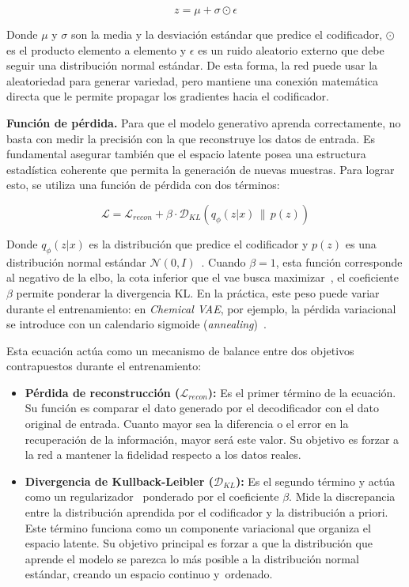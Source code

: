 \begin{equation}
z = \mu + \sigma \odot \epsilon
\end{equation}

Donde $\mu$ y $\sigma$ son la media y la desviación estándar que predice el codificador, $\odot$ es el producto elemento a elemento y $\epsilon$ es un ruido aleatorio externo que debe seguir una distribución normal estándar. De esta forma, la red puede usar la aleatoriedad para generar variedad, pero mantiene una conexión matemática directa que le permite propagar los gradientes hacia el codificador.

\textbf{Función de pérdida.} Para que el modelo generativo aprenda correctamente, no basta con medir la precisión con la que reconstruye los datos de entrada. Es fundamental asegurar también que el espacio latente posea una estructura estadística coherente que permita la generación de nuevas muestras. Para lograr esto, se utiliza una función de pérdida con dos términos:

\begin{equation}
\mathcal{L} = \mathcal{L}_{recon} + \beta \cdot \mathcal{D}_{KL}\left(q_{\phi}(z|x) \,\|\, p(z)\right)
\end{equation}

Donde $q_{\phi}(z|x)$ es la distribución que predice el codificador y $p(z)$ es una distribución normal estándar $\mathcal{N}(0, I)$~\cite{kingma2013auto}. Cuando $\beta = 1$, esta función corresponde al negativo de la \gls{elbo}, la cota inferior que el \gls{vae} busca maximizar~\cite{kingma2013auto, bishop2024deep}, el coeficiente $\beta$ permite ponderar la divergencia KL. En la práctica, este peso puede variar durante el entrenamiento: en \textit{Chemical VAE}, por ejemplo, la pérdida variacional se introduce con un calendario sigmoide (\textit{annealing})~\cite{GBWHLDSA18}.

Esta ecuación actúa como un mecanismo de balance entre dos objetivos contrapuestos durante el entrenamiento:

\begin{itemize}
    \item \textbf{Pérdida de reconstrucción ($\mathcal{L}_{recon}$):} Es el primer término de la ecuación. Su función es comparar el dato generado por el decodificador con el dato original de entrada. Cuanto mayor sea la diferencia o el error en la recuperación de la información, mayor será este valor. Su objetivo es forzar a la red a mantener la fidelidad respecto a los datos reales.
    \item \textbf{Divergencia de Kullback-Leibler ($\mathcal{D}_{KL}$):} Es el segundo término y actúa como un regularizador~\cite{kingma2013auto} ponderado por el coeficiente $\beta$. Mide la discrepancia entre la distribución aprendida por el codificador y la distribución a priori. Este término funciona como un componente variacional que organiza el espacio latente. Su objetivo principal es forzar a que la distribución que aprende el modelo se parezca lo más posible a la distribución normal estándar, creando un espacio continuo y~ordenado.
\end{itemize}

